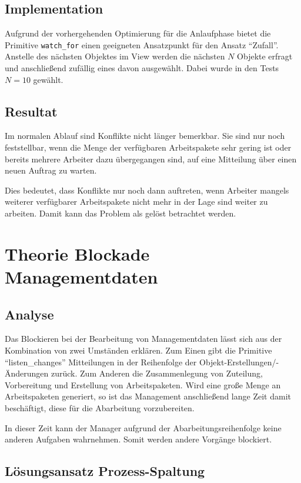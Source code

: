 \subsection{Implementation}

Aufgrund der vorhergehenden Optimierung für die Anlaufphase
bietet die Primitive \verb|watch_for| einen geeigneten Ansatzpunkt für den Ansatz ``Zufall''.
Anstelle des nächsten Objektes im View werden die nächsten $N$ Objekte erfragt
und anschließend zufällig eines davon ausgewählt.
Dabei wurde in den Tests $N = 10$ gewählt.

\subsection{Resultat}
Im normalen Ablauf sind Konflikte nicht länger bemerkbar.
Sie sind nur noch feststellbar, wenn die Menge der verfügbaren Arbeitspakete
sehr gering ist oder bereits mehrere Arbeiter dazu übergegangen sind,
auf eine Mitteilung über einen neuen Auftrag zu warten.

Dies bedeutet, dass Konflikte nur noch dann auftreten,
wenn Arbeiter mangels weiterer verfügbarer Arbeitspakete nicht mehr in der Lage sind weiter zu arbeiten. Damit kann das Problem als gelöst betrachtet werden.

\section{Theorie Blockade Managementdaten}
\subsection{Analyse}
Das Blockieren bei der Bearbeitung von Managementdaten lässt sich
aus der Kombination von zwei Umständen erklären.
Zum Einen gibt die Primitive ``listen\_changes'' Mitteilungen
in der Reihenfolge der Objekt-Erstellungen/-Änderungen zurück.
Zum Anderen die Zusammenlegung von Zuteilung, Vorbereitung
und Erstellung von Arbeitspaketen.
Wird eine große Menge an Arbeitspaketen generiert,
so ist das Management anschließend lange Zeit damit beschäftigt,
diese für die Abarbeitung vorzubereiten.

In dieser Zeit kann der Manager aufgrund der Abarbeitungsreihenfolge
keine anderen Aufgaben wahrnehmen.
Somit werden andere Vorgänge blockiert.

\subsection{Lösungsansatz Prozess-Spaltung}

